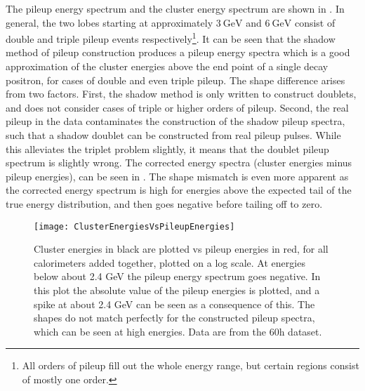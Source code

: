 The pileup energy spectrum and the cluster energy spectrum are shown in . In general, the two lobes starting at approximately $\SI{3}{\GeV}$ and $\SI{6}{\GeV}$ consist of double and triple pileup events respectively\footnote{All orders of pileup fill out the whole energy range, but certain regions consist of mostly one order.}. It can be seen that the shadow method of pileup construction produces a pileup energy spectra which is a good approximation of the cluster energies above the end point of a single decay positron, for cases of double and even triple pileup. The shape difference arises from two factors. First, the shadow method is only written to construct doublets, and does not consider cases of triple or higher orders of pileup. Second, the real pileup in the data contaminates the construction of the shadow pileup spectra, such that a shadow doublet can be constructed from real pileup pulses. While this alleviates the triplet problem slightly, it means that the doublet pileup spectrum is slightly wrong. The corrected energy spectra (cluster energies minus pileup energies), can be seen in . The shape mismatch is even more apparent as the corrected energy spectrum is high for energies above the expected tail of the true energy distribution, and then goes negative before tailing off to zero. 


    \begin{figure}
        \centering
        \texttt{[image: ClusterEnergiesVsPileupEnergies]}
        \caption[Cluster energies vs pileup energies]{Cluster energies in black are plotted vs pileup energies in red, for all calorimeters added together, plotted on a log scale. At energies below about 2.4 GeV the pileup energy spectrum goes negative. In this plot the absolute value of the pileup energies is plotted, and a spike at about 2.4 GeV can be seen as a consequence of this. The shapes do not match perfectly for the constructed pileup spectra, which can be seen at high energies. Data are from the 60h dataset.}    
        \label{fig:ClusterEnergiesVsPileupEnergies}
    \end{figure}


